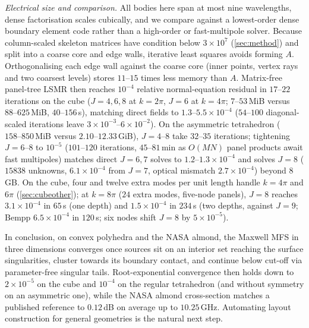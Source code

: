 \emph{Electrical size and comparison.} All bodies here span at most nine wavelengths, dense factorisation scales cubically, and we compare against a lowest-order dense boundary element code rather than a high-order or fast-multipole solver. Because column-scaled skeleton matrices have condition below $3\times10^7$ (\autoref{sec:method}) and split into a coarse core and edge walls, iterative least squares avoids forming $A$. Orthogonalising each edge wall against the coarse core (inner points, vertex rays and two coarsest levels) stores $11\text{--}15$ times less memory than $A$. Matrix-free panel-tree LSMR \cite{fong2011} then reaches $10^{-4}$ relative normal-equation residual in $17\text{--}22$ iterations on the cube ($J = 4,6,8$ at $k = 2\pi$, $J = 6$ at $k = 4\pi$; $7\text{--}53$\,MiB versus $88\text{--}625$\,MiB, $40\text{--}156$\,s), matching direct fields to $1.3\text{--}5.5\times10^{-4}$ ($54\text{--}100$ diagonal-scaled iterations leave $3\times10^{-3}\text{--}6\times10^{-2}$). On the asymmetric tetrahedron ($158\text{--}850$\,MiB versus $2.10\text{--}12.33$\,GiB), $J = 4\text{--}8$ take $32\text{--}35$ iterations; tightening $J = 6\text{--}8$ to $10^{-5}$ ($101\text{--}120$ iterations, $45\text{--}81$\,min as $O(MN)$ panel products await fast multipoles) matches direct $J = 6,7$ solves to $1.2\text{--}1.3\times10^{-4}$ and solves $J = 8$ ($15838$ unknowns, $6.1\times10^{-4}$ from $J = 7$, optical mismatch $2.7\times10^{-4}$) beyond $8$\,GB. On the cube, four and twelve extra modes per unit length handle $k = 4\pi$ and $6\pi$ (\autoref{sec:cubeother}); at $k = 8\pi$ ($24$ extra modes, five-node panels), $J = 8$ reaches $3.1\times10^{-4}$ in $65$\,s (one depth) and $1.5\times10^{-4}$ in $234$\,s (two depths, against $J = 9$; Bempp $6.5\times10^{-4}$ in $120$\,s; six nodes shift $J = 8$ by $5\times10^{-5}$).

In conclusion, on convex polyhedra and the NASA almond, the Maxwell MFS in three dimensions converges once sources sit on an interior set reaching the surface singularities, cluster towards its boundary contact, and continue below cut-off via parameter-free singular tails. Root-exponential convergence then holds down to $2\times10^{-5}$ on the cube and $10^{-4}$ on the regular tetrahedron (and without symmetry on an asymmetric one), while the NASA almond cross-section matches a published reference to $0.12$\,dB on average up to $10.25$\,GHz. Automating layout construction for general geometries is the natural next step.


